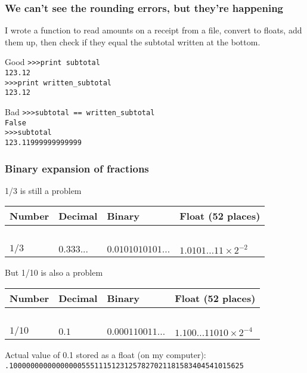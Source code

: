\documentclass{beamer}
\begin{document}
\begin{frame}\frametitle{We can't see the rounding errors, but they're happening}
I wrote a function to read amounts on a receipt from a file, convert to floats, add them up, then check if they equal the subtotal written at the bottom.

\begin{block}{Good}
\texttt{>>>print subtotal}\\
\texttt{123.12}\\
\texttt{>>>print written\_subtotal}\\
\texttt{123.12}\\
\end{block}
\pause
\begin{block}{Bad}
\texttt{>>>subtotal == written\_subtotal}\\
\texttt{False}\\
\texttt{>>>subtotal}\\
\texttt{123.11999999999999}
\end{block}

\end{frame}

\begin{frame}\frametitle{Binary expansion of fractions}

\begin{block}{1/3 is still a problem}
~\\
\begin{tabular}{l | l | l | l}
Number & Decimal & Binary & Float (52 places)\\
\hline
~&~&~&~\\

$1/3$ &$0.333...$& $0.0101010101...$ & $1.0101\ldots 11 \times 2^{-2}$
\end{tabular}
\end{block}
\pause

\begin{block}{But 1/10 is also a problem}
~\\
\begin{tabular}{l | l | l | l}
Number & Decimal & Binary & Float (52 places)\\
\hline
~&~&~&~\\

$1/10$ & $0.1$ & $0.000110011\ldots$ & $1.100...11010 \times 2^{-4}$  \\ 
\end{tabular}
\end{block}
\pause
\begin{block}{Actual value of 0.1 stored as a float (on my computer):}
{\fontsize{0.9em}{0.9em}
\texttt{.1000000000000000055511151231257827021181583404541015625}
}
\end{block}
\end{frame}
\end{document}
